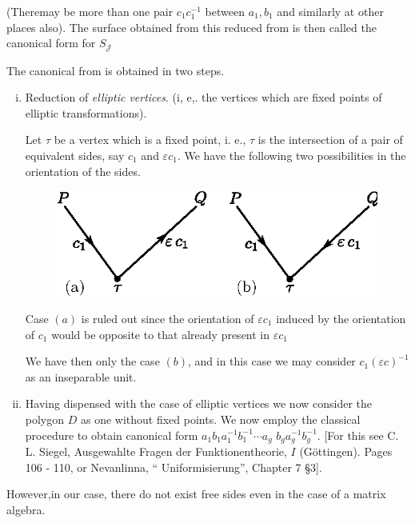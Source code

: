 (There\pageoriginale may be more than one pair $c_1 c^{-1}_{1}$ between $a_1,  b_1$
and similarly at other places also). The surface obtained from this
reduced from is then called the canonical form for $S_{\mathcal{J}}$ 

The canonical from is obtained in two steps. 

\begin{enumerate}[(i)]
\item Reduction of \textit{elliptic vertices}. (i, e,.  the vertices
  which are fixed points of elliptic transformations).  
  
  Let $\tau $ be a vertex which is a fixed point, i. e.,  $\tau$ is
  the intersection of a pair of equivalent sides, say $c_1$ and
  $\varepsilon c_1$. We have the following two possibilities in the
  orientation of the sides.  
  
\begin{figure}[H]
\centerline{\includegraphics{vol9-figures/fig9-3.eps}}
\end{figure}

  Case $(a)$ is ruled out since the orientation of $\varepsilon c_1$
  induced by the orientation of $c_1$ would be opposite to that already
  present in $\varepsilon c_1$  
  
  We have then only the case $(b)$, and in this case we may consider
  $c_1 (\varepsilon c)^{-1}$ as an inseparable unit.  

\item Having dispensed with the case of elliptic vertices we now
  consider the polygon $D$ as one without fixed points. We now employ
  the classical procedure to obtain canonical form $a_1 b_1 a^{-1}_1
  b^{-1}_{1} \cdots a_g$ $b_g a^{-1}_{g} b^{-1}_g$. [For this see
    C. L. Siegel, Ausgewahlte Fragen der Funktionentheorie,  $I$
    (G\"ottingen). Pages 106 - 110, or Nevanlinna, ``
    Uniformisierung'', Chapter 7 \S 3].  
\end{enumerate}

However,\pageoriginale in our case, there do not exist free sides even in
the case of a matrix algebra.  

